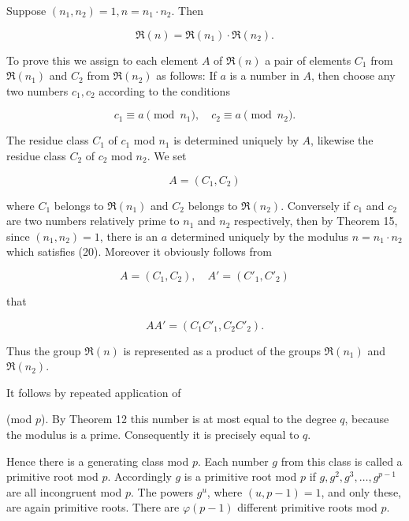 Suppose $(n_1, n_2) = 1, n = n_1 \cdot n_2$. Then

$$\Re(n) = \Re(n_1) \cdot \Re(n_2).$$

To prove this we assign to each element $A$ of $\Re(n)$ a pair of elements $C_1$ from $\Re(n_1)$ and $C_2$ from $\Re(n_2)$ as follows: If $a$ is a number in $A$, then choose any two numbers $c_1, c_2$ according to the conditions

$$c_1 \equiv a \pmod{n_1}, \quad c_2 \equiv a \pmod{n_2}. \tag{20}$$

The residue class $C_1$ of $c_1$ mod $n_1$ is determined uniquely by $A$, likewise the residue class $C_2$ of $c_2$ mod $n_2$. We set

$$A = (C_1, C_2)$$

where $C_1$ belongs to $\Re(n_1)$ and $C_2$ belongs to $\Re(n_2)$. Conversely if $c_1$ and $c_2$ are two numbers relatively prime to $n_1$ and $n_2$ respectively, then by Theorem 15, since $(n_1, n_2) = 1$, there is an $a$ determined uniquely by the modulus $n = n_1 \cdot n_2$ which satisfies (20). Moreover it obviously follows from

$$A = (C_1, C_2), \quad A' = (C'_1, C'_2)$$

that

$$AA' = (C_1 C'_1, C_2 C'_2).$$

Thus the group $\Re(n)$ is represented as a product of the groups $\Re(n_1)$ and $\Re(n_2)$.

It follows by repeated application of

(mod $p$). By Theorem 12 this number is at most equal to the degree $q$, because the modulus is a prime. Consequently it is precisely equal to $q$.

Hence there is a generating class mod $p$. Each number $g$ from this class is called a primitive root mod $p$. Accordingly $g$ is a primitive root mod $p$ if $g, g^2, g^3, \ldots, g^{p-1}$ are all incongruent mod $p$. The powers $g^u$, where $(u, p-1) = 1$, and only these, are again primitive roots. There are $\varphi(p-1)$ different primitive roots mod $p$.
